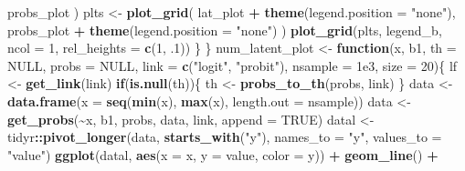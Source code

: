 \documentclass[
  man,floatsintext]{apa6}
\newenvironment{Shaded}{\begin{snugshade}}{\end{snugshade}}
\newcommand{\AttributeTok}[1]{\textcolor[rgb]{0.13,0.29,0.53}{#1}}
\newcommand{\ConstantTok}[1]{\textcolor[rgb]{0.56,0.35,0.01}{#1}}
\newcommand{\ControlFlowTok}[1]{\textcolor[rgb]{0.13,0.29,0.53}{\textbf{#1}}}
\newcommand{\DecValTok}[1]{\textcolor[rgb]{0.00,0.00,0.81}{#1}}
\newcommand{\FloatTok}[1]{\textcolor[rgb]{0.00,0.00,0.81}{#1}}
\newcommand{\FunctionTok}[1]{\textcolor[rgb]{0.13,0.29,0.53}{\textbf{#1}}}
\newcommand{\NormalTok}[1]{#1}
\newcommand{\OtherTok}[1]{\textcolor[rgb]{0.56,0.35,0.01}{#1}}
\newcommand{\SpecialCharTok}[1]{\textcolor[rgb]{0.81,0.36,0.00}{\textbf{#1}}}
\newcommand{\StringTok}[1]{\textcolor[rgb]{0.31,0.60,0.02}{#1}}
\begin{document}
\begin{Shaded}
\begin{Highlighting}[]
\NormalTok{      probs\_plot}
\NormalTok{    )}
\NormalTok{    plts }\OtherTok{\textless{}{-}} \FunctionTok{plot\_grid}\NormalTok{(}
\NormalTok{      lat\_plot }\SpecialCharTok{+} \FunctionTok{theme}\NormalTok{(}\AttributeTok{legend.position =} \StringTok{"none"}\NormalTok{),}
\NormalTok{      probs\_plot }\SpecialCharTok{+} \FunctionTok{theme}\NormalTok{(}\AttributeTok{legend.position =} \StringTok{"none"}\NormalTok{)}
\NormalTok{    )}
    \FunctionTok{plot\_grid}\NormalTok{(plts, legend\_b, }\AttributeTok{ncol =} \DecValTok{1}\NormalTok{, }\AttributeTok{rel\_heights =} \FunctionTok{c}\NormalTok{(}\DecValTok{1}\NormalTok{, .}\DecValTok{1}\NormalTok{))}
\NormalTok{  \}}
\NormalTok{\}}
\NormalTok{num\_latent\_plot }\OtherTok{\textless{}{-}} \ControlFlowTok{function}\NormalTok{(x, }
\NormalTok{                            b1, }
                            \AttributeTok{th =} \ConstantTok{NULL}\NormalTok{, }
                            \AttributeTok{probs =} \ConstantTok{NULL}\NormalTok{,}
                            \AttributeTok{link =} \FunctionTok{c}\NormalTok{(}\StringTok{"logit"}\NormalTok{, }\StringTok{"probit"}\NormalTok{), }
                            \AttributeTok{nsample =} \FloatTok{1e3}\NormalTok{, }
                            \AttributeTok{size =} \DecValTok{20}\NormalTok{)\{}
\NormalTok{  lf }\OtherTok{\textless{}{-}} \FunctionTok{get\_link}\NormalTok{(link)}
  \ControlFlowTok{if}\NormalTok{(}\FunctionTok{is.null}\NormalTok{(th))\{}
\NormalTok{    th }\OtherTok{\textless{}{-}} \FunctionTok{probs\_to\_th}\NormalTok{(probs, link)}
\NormalTok{  \}}
\NormalTok{  data }\OtherTok{\textless{}{-}} \FunctionTok{data.frame}\NormalTok{(}\AttributeTok{x =} \FunctionTok{seq}\NormalTok{(}\FunctionTok{min}\NormalTok{(x), }\FunctionTok{max}\NormalTok{(x), }\AttributeTok{length.out =}\NormalTok{ nsample))}
\NormalTok{  data }\OtherTok{\textless{}{-}} \FunctionTok{get\_probs}\NormalTok{(}\SpecialCharTok{\textasciitilde{}}\NormalTok{x, b1, probs, data, link, }\AttributeTok{append =} \ConstantTok{TRUE}\NormalTok{)}
\NormalTok{  datal }\OtherTok{\textless{}{-}}\NormalTok{ tidyr}\SpecialCharTok{::}\FunctionTok{pivot\_longer}\NormalTok{(data, }\FunctionTok{starts\_with}\NormalTok{(}\StringTok{"y"}\NormalTok{), }\AttributeTok{names\_to =} \StringTok{"y"}\NormalTok{, }\AttributeTok{values\_to =} \StringTok{"value"}\NormalTok{)}
  \FunctionTok{ggplot}\NormalTok{(datal, }\FunctionTok{aes}\NormalTok{(}\AttributeTok{x =}\NormalTok{ x, }\AttributeTok{y =}\NormalTok{ value, }\AttributeTok{color =}\NormalTok{ y)) }\SpecialCharTok{+}
    \FunctionTok{geom\_line}\NormalTok{() }\SpecialCharTok{+}

\end{Highlighting}
\end{Shaded}
\end{document}
